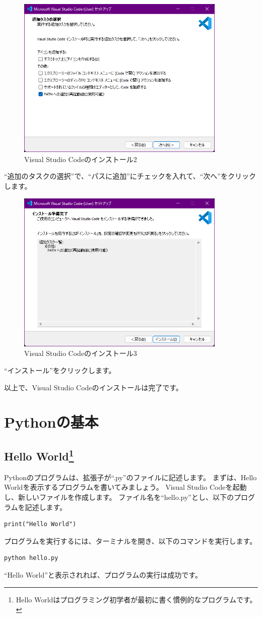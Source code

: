 \documentclass[a4paper,titlepage,dvipdfmx]{jarticle}
\begin{document}
\begin{figure}[H]
  \centering
  \includegraphics[width=10cm]{./figs/vscode-install2.png}
  \caption{Visual Studio Codeのインストール2}
\end{figure}
``追加のタスクの選択''で、``パスに追加''にチェックを入れて、``次へ''をクリックします。

\begin{figure}[H]
  \centering
  \includegraphics[width=10cm]{./figs/vscode-install3.png}
  \caption{Visual Studio Codeのインストール3}
\end{figure}
``インストール''をクリックします。

以上で、Visual Studio Codeのインストールは完了です。

\section{Pythonの基本}
\subsection{Hello World\protect\footnote{Hello Worldはプログラミング初学者が最初に書く慣例的なプログラムです。}}
Pythonのプログラムは、拡張子が``.py''のファイルに記述します。
まずは、Hello Worldを表示するプログラムを書いてみましょう。
Visual Studio Codeを起動し、新しいファイルを作成します。
ファイル名を``hello.py''とし、以下のプログラムを記述します。
\begin{lstlisting}[caption=hello.py]
print("Hello World")
\end{lstlisting}
プログラムを実行するには、ターミナルを開き、以下のコマンドを実行します。
\begin{lstlisting}
python hello.py
\end{lstlisting}
``Hello World''と表示されれば、プログラムの実行は成功です。
\end{document}
